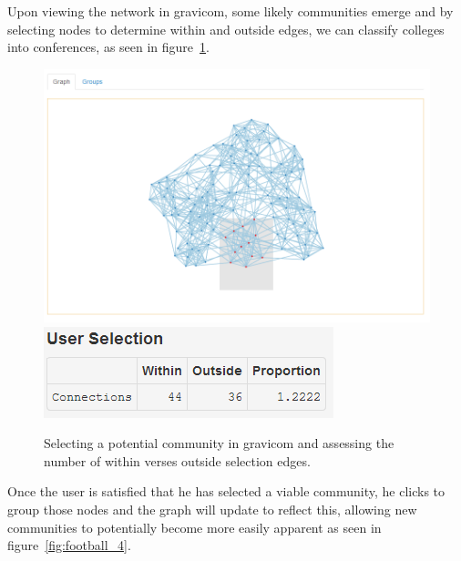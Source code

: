 \documentclass{article}\usepackage[]{graphicx}\usepackage[]{color}
\begin{document}
Upon viewing the network in gravicom, some likely communities emerge and by selecting nodes to determine within and outside edges, we can classify colleges into conferences, as seen in figure~\ref{fig:football_2}.

\begin{figure}[H]
\centering
\includegraphics[width=\textwidth]{images/football_2.png}
\includegraphics[]{images/football_3.png}
\caption{\label{fig:football_2} Selecting a potential community in gravicom and assessing the number of within verses outside selection edges.}
\end{figure}

Once the user is satisfied that he has selected a viable community, he clicks to group those nodes and the graph will update to reflect this, allowing new communities to potentially become more easily apparent as seen in figure~\ref{fig:football_4}. 
\end{document}
